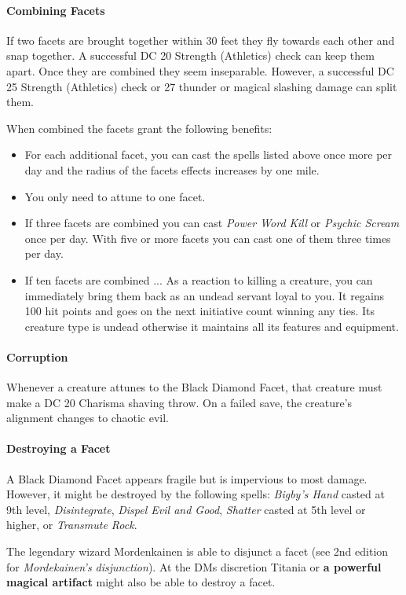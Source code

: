 \documentclass[letter,10pt,twocolumn,openany]{dndbook}
\begin{document}
\paragraph{Combining Facets}
If two facets are brought together within 30 feet they fly towards each other and snap together.
A successful DC 20 Strength (Athletics) check can keep them apart.
Once they are combined they seem inseparable.
However, a successful DC 25 Strength (Athletics) check or 27 thunder or magical slashing damage can split them.

When combined the facets grant the following benefits:
\begin{itemize}
    \item For each additional facet, you can cast the spells listed above once more per day and the radius of the facets effects increases by one mile.
    \item You only need to attune to one facet.
    \item If three facets are combined you can cast \textit{Power Word Kill} or \textit{Psychic Scream} once per day.
          With five or more facets you can cast one of them three times per day.
    \item If ten facets are combined ...
          As a reaction to killing a creature, you can immediately bring them back as an undead servant loyal to you.
          It regains 100 hit points and goes on the next initiative count winning any ties.
          Its creature type is undead otherwise it maintains all its features and equipment.
\end{itemize}

\paragraph{Corruption}
Whenever a creature attunes to the Black Diamond Facet, that creature must make a DC 20 Charisma shaving throw.
On a failed save, the creature's alignment changes to chaotic evil.

\paragraph{Destroying a Facet}
A Black Diamond Facet appears fragile but is impervious to most damage.
However, it might be destroyed by the following spells:
\textit{Bigby's Hand} casted at 9th level,
\textit{Disintegrate},
\textit{Dispel Evil and Good},
\textit{Shatter} casted at 5th level or higher,
or \textit{Transmute Rock}.

The legendary wizard Mordenkainen is able to disjunct a facet (see 2nd edition for \textit{Mordekainen's disjunction}).
At the DMs discretion Titania or \textbf{a powerful magical artifact} might also be able to destroy a facet.
\end{document}
